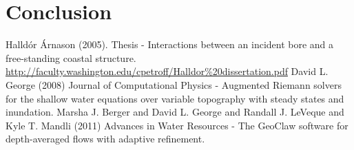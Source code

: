 \documentclass[11pt]{article}
\begin{document}
\section{Conclusion}\label{Sec:Conclusion}
{\footnotesize
\begin{thebibliography}{100}
 Halld\'or \'Arnason  (2005). Thesis - Interactions between an incident bore and a free-standing coastal structure. \url{http://faculty.washington.edu/cpetroff/Halldor%20dissertation.pdf}
 David L. George (2008) Journal of Computational Physics - Augmented Riemann solvers for the shallow water equations over variable topography with steady states and inundation.
 Marsha J. Berger and David L. George and Randall J. LeVeque and Kyle T. Mandli (2011) Advances in Water Resources - The GeoClaw software for depth-averaged flows with adaptive refinement.
\end{thebibliography}
}
\end{document}
